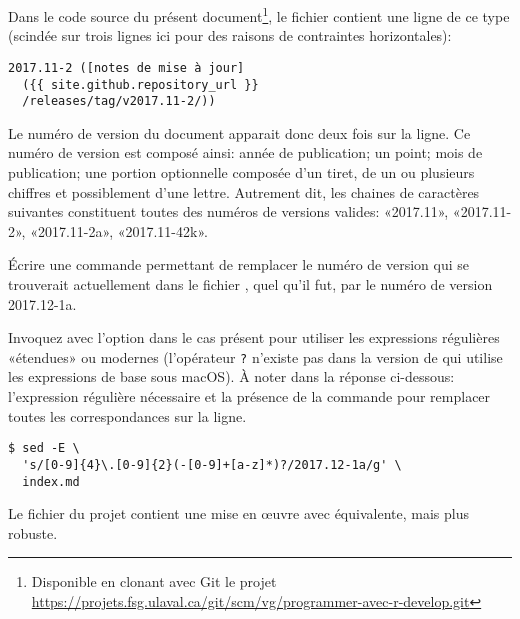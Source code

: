 \begin{exercice}
  Dans le code source du présent document\footnote{%
    Disponible en clonant avec Git le projet
    \url{https://projets.fsg.ulaval.ca/git/scm/vg/programmer-avec-r-develop.git}}, %
  le fichier  contient une ligne de ce type
  (scindée sur trois lignes ici pour des raisons de contraintes
  horizontales):
  \begin{Schunk}
\begin{Verbatim}
2017.11-2 ([notes de mise à jour]
  ({{ site.github.repository_url }}
  /releases/tag/v2017.11-2/))
\end{Verbatim}
  \end{Schunk}
  Le numéro de version du document apparait donc deux fois sur la
  ligne. Ce numéro de version est composé ainsi: année de publication;
  un point; mois de publication; une portion optionnelle composée d'un
  tiret, de un ou plusieurs chiffres et possiblement d'une lettre.
  Autrement dit, les chaines de caractères suivantes constituent
  toutes des numéros de versions valides: «2017.11», «2017.11-2»,
  «2017.11-2a», «2017.11-42k».

  Écrire une commande  permettant de remplacer le numéro de
  version qui se trouverait actuellement dans le fichier
  , quel qu'il fut, par le numéro de version
  2017.12-1a.
  \begin{sol}
    Invoquez  avec l'option  dans le cas présent
    pour utiliser les expressions régulières «étendues» ou modernes
    (l'opérateur \verb=?= n'existe pas dans la version de 
    qui utilise les expressions de base sous macOS). À noter dans la
    réponse ci-dessous: l'expression régulière nécessaire et la
    présence de la commande  pour remplacer toutes les
    correspondances sur la ligne.
    \begin{Schunk}
\begin{Verbatim}
$ sed -E \
  's/[0-9]{4}\.[0-9]{2}(-[0-9]+[a-z]*)?/2017.12-1a/g' \
  index.md
\end{Verbatim}
    \end{Schunk}
    Le fichier  du projet contient une mise en
    œuvre avec  équivalente, mais plus robuste.
  \end{sol}
\end{exercice}



